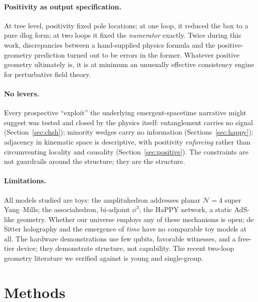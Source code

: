 \documentclass[11pt]{article}
\newcommand{\N}{\mathcal{N}}
\begin{document}
\paragraph{Positivity as output specification.} At tree level,
positivity fixed pole locations; at one loop, it reduced the box to a
pure dlog form; at two loops it fixed the \emph{numerator} exactly.
Twice during this work, discrepancies between a hand-supplied physics
formula and the positive-geometry prediction turned out to be errors in
the former. Whatever positive geometry ultimately is, it is at minimum
an unusually effective consistency engine for perturbative field
theory.

\paragraph{No levers.} Every prospective ``exploit'' the underlying
emergent-spacetime narrative might suggest was tested and closed by the
physics itself: entanglement carries no signal
(Section~\ref{sec:chsh}); minority wedges carry no information
(Sections~\ref{sec:happy}); adjacency in kinematic space is descriptive,
with positivity \emph{enforcing} rather than circumventing locality and
causality (Section~\ref{sec:positive}). The constraints are not
guardrails around the structure; they are the structure.

\paragraph{Limitations.} All models studied are toys: the amplituhedron
addresses planar $\N=4$ super Yang--Mills; the associahedron, bi-adjoint
$\phi^3$; the HaPPY network, a static AdS-like geometry. Whether our
universe employs any of these mechanisms is open; de Sitter holography
and the emergence of \emph{time} have no comparable toy models at all.
The hardware demonstrations use few qubits, favorable witnesses, and a
free-tier device; they demonstrate structure, not capability. The
recent two-loop geometry literature we verified against
\citep{Dian:2024tvi} is young and single-group.

\section{Methods}
\end{document}
